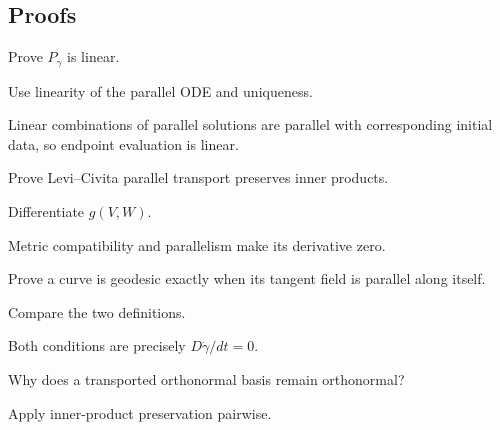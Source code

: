 \subsection*{Proofs}

\begin{exercise}[Linearity]\label{exr:vii24-ped-06}
Prove \(P_\gamma\) is linear.
\end{exercise}

\begin{hint}
Use linearity of the parallel ODE and uniqueness.
\end{hint}

\begin{solution}
Linear combinations of parallel solutions are parallel with corresponding initial data, so endpoint evaluation is linear.
\end{solution}

\begin{exercise}\label{exr:vii24-ped-07}
Prove Levi--Civita parallel transport preserves inner products.
\end{exercise}

\begin{hint}
Differentiate \(g(V,W)\).
\end{hint}

\begin{solution}
Metric compatibility and parallelism make its derivative zero.
\end{solution}

\begin{exercise}\label{exr:vii24-ped-08}
Prove a curve is geodesic exactly when its tangent field is parallel along itself.
\end{exercise}

\begin{hint}
Compare the two definitions.
\end{hint}

\begin{solution}
Both conditions are precisely \(D\dot\gamma/dt=0\).
\end{solution}

\begin{exercise}\label{exr:vii24-ped-09}
Why does a transported orthonormal basis remain orthonormal?
\end{exercise}

\begin{hint}
Apply inner-product preservation pairwise.
\end{hint}

